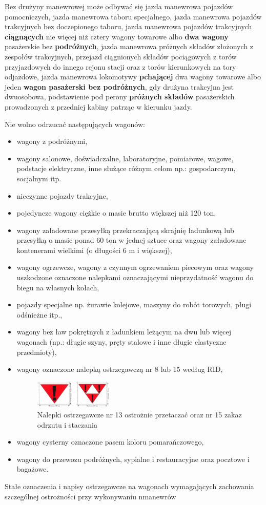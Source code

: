 Bez drużyny manewrowej może odbywać się jazda manewrowa pojazdów pomocniczych, jazda manewrowa taboru specjalnego, jazda manewrowa pojazdów trakcyjnych bez doczepionego taboru, jazda manewrowa pojazdów trakcyjnych \textbf{ciągnących} nie więcej niż cztery wagony towarowe albo \textbf{dwa wagony} pasażerskie bez \textbf{podróżnych}, jazda manewrowa próżnych składów złożonych z zespołów trakcyjnych, przejazd ciągnionych składów pociągowych z torów przyjazdowych do innego rejonu stacji oraz z torów kierunkowych na tory odjazdowe, jazda manewrowa lokomotywy \textbf{pchającej} dwa wagony towarowe albo jeden \textbf{wagon pasażerski bez podróżnych}, gdy drużyna trakcyjna jest dwuosobowa, podstawienie pod perony \textbf{próżnych składów} pasażerskich prowadzonych z przedniej kabiny patrząc w kierunku jazdy.

Nie wolno odrzucać następujących wagonów:

\begin{itemize}
\item wagony z podróżnymi,
\item wagony salonowe, doświadczalne, laboratoryjne, pomiarowe, wagowe, podstacje elektryczne, inne służące różnym celom np.:
gospodarczym, socjalnym itp.
\item 
nieczynne pojazdy trakcyjne,
\item 
pojedyncze wagony ciężkie o masie brutto większej niż 120 ton,
\item wagony załadowane przesyłką przekraczającą skrajnię ładunkową lub przesyłką o masie ponad 60 ton w jednej sztuce oraz
wagony załadowane kontenerami wielkimi (o długości 6 m i większej),
\item wagony ogrzewcze, wagony z czynnym ogrzewaniem piecowym oraz wagony uszkodzone oznaczone nalepkami oznaczającymi
nieprzydatność wagonu do biegu na własnych kołach,
\item pojazdy specjalne np. żurawie kolejowe, maszyny do robót torowych, pługi odśnieżne itp.,
\item wagony bez ław pokrętnych z ładunkiem leżącym na dwu lub więcej wagonach (np.: długie szyny, pręty stalowe i inne długie
elastyczne przedmioty), 
\item wagony oznaczone nalepką ostrzegawczą nr 8 lub 15 według RID,
\begin{figure}
	\includegraphics[width=0.35\textwidth]{skryptkierownik-img/znaki-manewrowania.png}
	\caption{Nalepki ostrzegawcze nr 13 ostrożnie przetaczać oraz nr 15 zakaz odrzutu i staczania} 
	\end{figure}
\item wagony cysterny oznaczone pasem koloru pomarańczowego, 
\item wagony do przewozu podróżnych, sypialne i restauracyjne oraz pocztowe i bagażowe.
\end{itemize}
Stałe oznaczenia i napisy ostrzegawcze na wagonach wymagających zachowania szczególnej ostrożności przy wykonywaniu nmanewrów

